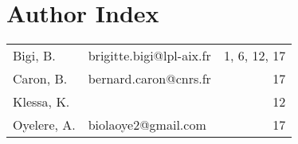 \documentclass[12pt,a4paper]{article}
\begin{document}
 
 \setcounter{page}{23} 
    \pagestyle{fancy} 
\section*{Author Index}
\begin{longtable}{p{45mm}p{75mm}r}
Bigi, B. & {\sf brigitte.bigi@lpl-aix.fr} & 1, 6, 12, 17 \\ 
Caron, B. & {\sf bernard.caron@cnrs.fr} & 17 \\ 
Klessa, K. & {\sf } & 12 \\ 
Oyelere, A. & {\sf biolaoye2@gmail.com} & 17 \\ 
\end{longtable}
 
 
\end{document}
